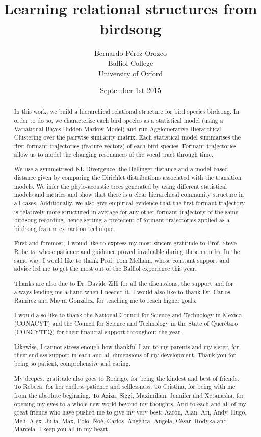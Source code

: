 \documentclass[pdftex,12pt,a4paper]{report}
\title{Learning relational structures from birdsong}
\author{Bernardo Pérez Orozco\\Balliol College\\University of Oxford}
\date{ September 1st 2015 }
\theoremstyle{definition}
\theoremstyle{remark}
\begin{document}
 

\begin{abstract}
In this work, we build a hierarchical relational structure for bird species birdsong. In order to do so, we characterise each bird species as a statistical model (using a Variational Bayes Hidden Markov Model) and run Agglomerative Hierarchical Clustering over the pairwise similarity matrix. Each statistical model summarises the first-formant trajectories (feature vectors) of each bird species. Formant trajectories allow us to model the changing resonances of the vocal tract through time.
\par We use a symmetrised KL-Divergence, the Hellinger distance and a model based distance given by comparing the Dirichlet distributions associated with the transition models. We infer the phylo-acoustic trees generated by using different statistical models and metrics and show that there is a clear hierarchical community structure in all cases. Additionally, we also give empirical evidence that the first-formant trajectory is relatively more structured in average for any other formant trajectory of the same birdsong recording, hence setting a precedent of formant trajectories applied as a birdsong feature extraction technique.
\end{abstract}

\renewcommand{\abstractname}{Acknowledgements}
\begin{abstract}
First and foremost, I would like to express my most sincere gratitude to Prof. Steve Roberts, whose patience and guidance proved invaluable during these months. In the same way, I would like to thank Prof. Tom Melham, whose constant support and advice led me to get the most out of the Balliol experience this year.
\par Thanks are also due to Dr. Davide Zilli for all the discussions, the support and for always lending me a hand when I needed it. I would also like to thank Dr. Carlos Ramírez and Mayra González, for teaching me to reach higher goals.
\par I would also like to thank the National Council for Science and Technology in Mexico (CONACYT) and the Council for Science and Technology in the State of Querétaro (CONCYTEQ) for their financial support throughout the year.
\par Likewise, I cannot stress enough how thankful I am to my parents and my sister, for their endless support in each and all dimensions of my development. Thank you for being so patient, comprehensive and caring. 
\par My deepest gratitude also goes to Rodrigo, for being the kindest and best of friends. To Rebeca, for her endless patience and selflessness. To Cristina, for being with me from the absolute beginning. To Aziza, Siggi, Maximilian, Jennifer and Xetanasha, for opening my eyes to a whole new world beyond my thoughts. And to each and all of my great friends who have pushed me to give my very best: Aarón, Alan, Ari, Andy, Hugo, Meli, Alex, Julia, Max, Polo, Noé, Carlos, Angélica, Angela, César, Rodyka and Marcela. I keep you all in my heart.

\end{abstract}
\end{document}
